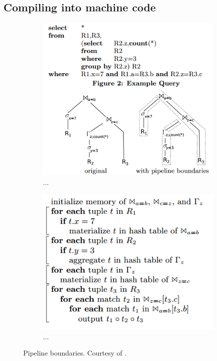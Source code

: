 \subsection{Compiling into machine code}
\label{sub:Compiling into machine code}
\begin{figure}
  \centering
  \begin{subfigure}{0.45\textwidth}
    \includegraphics[width=\textwidth]{img/pipeline-boundary-1.png}
    \caption{...}
    \label{fig:pipeline-boundary-1} 
  \end{subfigure}
  \begin{subfigure}{0.45\textwidth}
    \includegraphics[width=\textwidth]{img/pipeline-boundary-2.png}
    \caption{...}
    \label{fig:pipeline-boundary-2} 
  \end{subfigure}
  \caption{Pipeline boundaries. Courtesy of \cite{Neumann2011-uq}.}
  \label{fig:pipeline-boundary} 
\end{figure}
